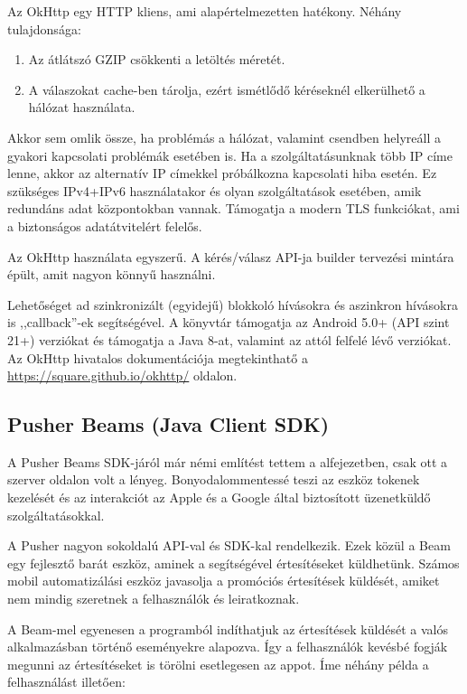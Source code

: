 \documentclass{thesis-ekf}
\theoremstyle{definition}
\theoremstyle{remark}
\begin{document}
Az OkHttp egy HTTP kliens, ami alapértelmezetten hatékony. Néhány tulajdonsága:

\begin{enumerate}
	\item Az átlátszó GZIP csökkenti a letöltés méretét.
	\item A válaszokat cache-ben tárolja, ezért ismétlődő kéréseknél elkerülhető a hálózat használata.
	
\end{enumerate}

Akkor sem omlik össze, ha problémás a hálózat, valamint csendben helyreáll a gyakori kapcsolati problémák esetében is.
Ha a szolgáltatásunknak több IP címe lenne, akkor az alternatív IP címekkel próbálkozna kapcsolati hiba esetén.
Ez szükséges IPv4+IPv6 használatakor és olyan szolgáltatások esetében, amik redundáns adat központokban vannak.
Támogatja a modern TLS funkciókat, ami a biztonságos adatátvitelért felelős.

Az OkHttp használata egyszerű. A kérés/válasz API-ja builder tervezési mintára épült, amit nagyon könnyű használni.

Lehetőséget ad szinkronizált (egyidejű) blokkoló hívásokra és aszinkron hívásokra is ,,callback''-ek segítségével.
A könyvtár támogatja az Android 5.0+ (API szint 21+) verziókat és támogatja a Java 8-at, valamint az attól felfelé lévő verziókat.
Az OkHttp hivatalos dokumentációja megtekinthatő a \url{https://square.github.io/okhttp/} oldalon.

\subsection{Pusher Beams (Java Client SDK)}

A Pusher Beams SDK-járól már némi említést tettem a  alfejezetben, csak ott a szerver oldalon volt a lényeg.
Bonyodalommentessé teszi az eszköz tokenek kezelését és az interakciót az Apple és a Google által biztosított üzenetküldő szolgáltatásokkal.

A Pusher nagyon sokoldalú API-val és SDK-kal rendelkezik. 
Ezek közül a Beam egy fejlesztő barát eszköz, aminek a segítségével értesítéseket küldhetünk.
Számos mobil automatizálási eszköz javasolja a promóciós értesítések küldését, amiket nem mindig szeretnek a felhasználók és leiratkoznak.

A Beam-mel egyenesen a programból indíthatjuk az értesítések küldését a valós alkalmazásban történő eseményekre alapozva. 
Így a felhasználók kevésbé fogják megunni az értesítéseket is törölni esetlegesen az appot. 
Íme néhány példa a felhasználást illetően:
\end{document}
